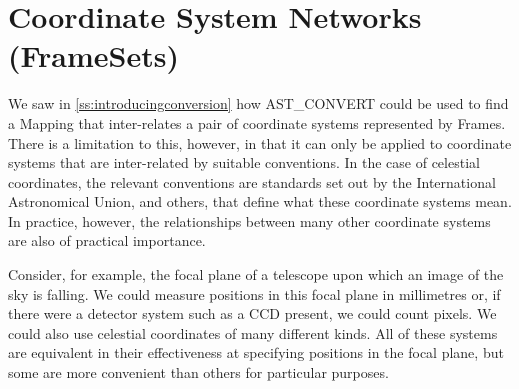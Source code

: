 \documentclass[twoside,11pt]{article}
\newcommand{\htmlref}[2]{#1}
\newcommand{\secref}[1]{\S\ref{#1}}
\renewcommand{\secref}[1]{\ref{#1}}
\begin{document}
%
%
%

\cleardoublepage
\section{\label{ss:framesets}Coordinate System Networks (FrameSets)}

We saw in \secref{ss:introducingconversion} how \htmlref{AST\_CONVERT}{AST_CONVERT} could be
used to find a \htmlref{Mapping}{Mapping} that inter-relates a pair of coordinate systems
represented by Frames. There is a limitation to this, however, in that
it can only be applied to coordinate systems that are inter-related by
suitable conventions. In the case of celestial coordinates, the
relevant conventions are standards set out by the International
Astronomical Union, and others, that define what these coordinate
systems mean. In practice, however, the relationships between many
other coordinate systems are also of practical importance.

Consider, for example, the focal plane of a telescope upon which an
image of the sky is falling. We could measure positions in this focal
plane in millimetres or, if there were a detector system such as a CCD
present, we could count pixels. We could also use celestial
coordinates of many different kinds. All of these systems are
equivalent in their effectiveness at specifying positions in the focal
plane, but some are more convenient than others for particular
purposes.
\end{document}
